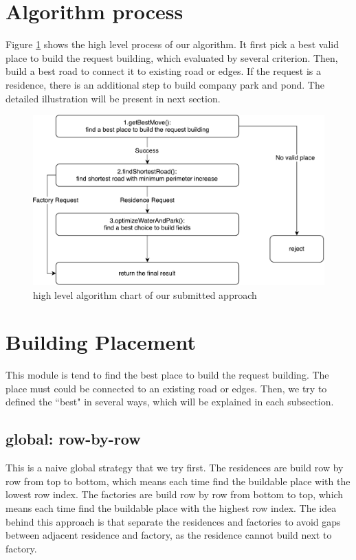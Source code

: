 \documentclass{article}
\begin{document}
\section{Algorithm process}
Figure \ref{fig:pentos} shows the high level process of our algorithm. It first pick a best valid place to build the request building, which evaluated by several criterion. Then, build a best road to connect it to existing road or edges. If the request is a residence, there is an additional step to build company park and pond. The detailed illustration will be present in next section.

\begin{figure}
\center
\includegraphics[scale=0.5]{pentos.pdf}
\caption{high level algorithm chart of our submitted approach}
\label{fig:pentos}
\end{figure}

\section{Building Placement}
This module is tend to find the best place to build the request building. The place must could be connected to an existing road or edges. Then, we try to defined the ``best" in several ways, which will be explained in each subsection.
\subsection{global: row-by-row}
This is a naive global strategy that we try first. The residences are build row by row from top to bottom, which means each time find the buildable place with the lowest row index. The factories are build row by row from bottom to top, which means each time find the buildable place with the highest row index. The idea behind this approach is that separate the residences and factories to avoid gaps between adjacent residence and factory, as the residence cannot build next to factory.
\end{document}
